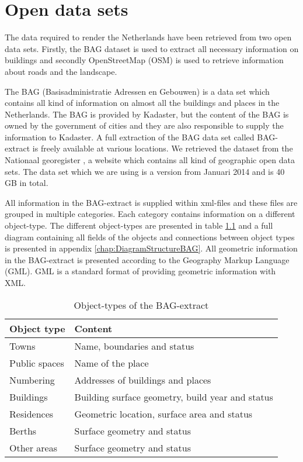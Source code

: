 \chapter{Open data sets}
\label{chap:OpenDataSets}
The data required to render the Netherlands have been retrieved from two open data sets. Firstly, the BAG dataset \cite{BAG14} is used to extract all necessary information on buildings and secondly OpenStreetMap (OSM) \cite{OSM14} is used to retrieve information about roads and the landscape.

The BAG (Basisadministratie Adressen en Gebouwen) is a data set which contains all kind of information on almost all the buildings and places in the Netherlands. The BAG is provided by Kadaster, but the content of the BAG is owned by the government of cities and they are also responsible to supply the information to Kadaster. A full extraction of the BAG data set called BAG-extract is freely available at various locations. We retrieved the dataset from the Nationaal georegister \cite{NG14}, a website which contains all kind of geographic open data sets. The data set which we are using is a version from Januari 2014 and is 40 GB in total.

All information in the BAG-extract is supplied within xml-files and these files are grouped in multiple categories. Each category contains information on a different object-type. The different object-types are presented in table \ref{Table:ObjectTypesBAG} and a full diagram containing all fields of the objects and connections between object types is presented in appendix \ref{chap:DiagramStructureBAG}. All geometric information in the BAG-extract is presented according to the Geography Markup Language (GML). GML is a standard format of providing geometric information with XML.

\begin{table}
  \centering
  \begin{tabular}{l l}
    \textbf{Object type} & \textbf{Content}     \\ \hline
    Towns & Name, boundaries and status  \\ \hline
    Public spaces & Name of the place  \\ \hline
    Numbering & Addresses of buildings and places  \\ \hline
    Buildings & Building surface geometry, build year and status  \\ \hline
    Residences & Geometric location, surface area and status  \\ \hline
    Berths & Surface geometry and status  \\ \hline
    Other areas & Surface geometry and status \\
  \end{tabular}
  \caption{Object-types of the BAG-extract}
  \label{Table:ObjectTypesBAG}
\end{table}

